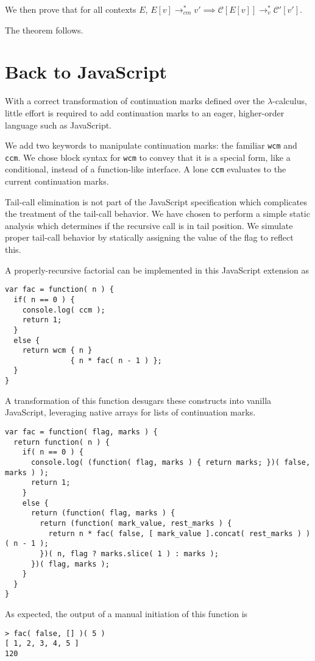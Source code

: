 \documentclass{llncs}
\newcommand{\lc}[0]{$\lambda$-calculus}
\newcommand{\lvrrs}[0]{\rightarrow_v^{*}}
\newcommand{\cmrrs}[0]{\rightarrow_{cm}^{*}}
\newcommand{\C}[1]{\mathcal{C}[#1]}
\newcommand{\Cp}[1]{\mathcal{C}'[#1]}
\begin{document}
We then prove that for all contexts $E$, $E[v]\cmrrs v'\implies\C{E[v]}\lvrrs\Cp{v'}$.

The theorem follows.

\section{Back to JavaScript}
\label{sec-javascript}

With a correct transformation of continuation marks defined over the \lc, little effort is required to add continuation marks to an eager, higher-order language such as JavaScript.

We add two keywords to manipulate continuation marks: the familiar \texttt{wcm} and \texttt{ccm}. We chose block syntax for \texttt{wcm} to convey that it is a special form, like a conditional, instead of a function-like interface. A lone \texttt{ccm} evaluates to the current continuation marks.

Tail-call elimination is not part of the JavaScript specification which complicates the treatment of the tail-call behavior. We have chosen to perform a simple static analysis which determines if the recursive call is in tail position. We simulate proper tail-call behavior by statically assigning the value of the flag to reflect this.

A properly-recursive factorial can be implemented in this JavaScript extension as
\begin{verbatim}
var fac = function( n ) {
  if( n == 0 ) {
    console.log( ccm );
    return 1;
  }
  else {
    return wcm { n }
               { n * fac( n - 1 ) };
  }
}
\end{verbatim}

A transformation of this function desugars these constructs into vanilla JavaScript, leveraging native arrays for lists of continuation marks.
\begin{verbatim}
var fac = function( flag, marks ) {
  return function( n ) {
    if( n == 0 ) {
      console.log( (function( flag, marks ) { return marks; })( false, marks ) );
      return 1;
    }
    else {
      return (function( flag, marks ) {
        return (function( mark_value, rest_marks ) {
          return n * fac( false, [ mark_value ].concat( rest_marks ) )( n - 1 );
        })( n, flag ? marks.slice( 1 ) : marks );
      })( flag, marks );
    }
  }
}
\end{verbatim}

As expected, the output of a manual initiation of this function is
\begin{verbatim}
> fac( false, [] )( 5 )
[ 1, 2, 3, 4, 5 ]
120
\end{verbatim}
\end{document}
